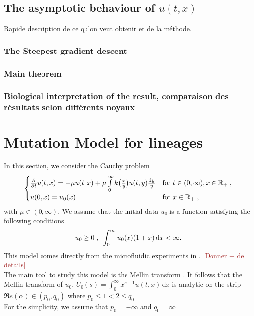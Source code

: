\documentclass[11pt]{amsart}
\renewcommand{\Re}{\mathfrak{R}e}
\newcommand{\diff}{\,\mathrm{d}}
\newcommand{\ndr}[1]{\textcolor{brown}{[#1]}}
\begin{document}
    \subsection*{The asymptotic behaviour of $u(t,x)$}
    Rapide description de ce qu'on veut obtenir et de la méthode.
        \subsubsection*{The Steepest gradient descent}
        \subsubsection*{Main theorem}
        \subsubsection*{Biological interpretation of the result, comparaison des résultats selon différents noyaux}



\section{Mutation Model for lineages}
\label{s:lineage}

In this section, we consider the Cauchy problem
\begin{equation}
    \begin{cases}
	\frac{\partial}{\partial t}u(t,x) = - \mu u(t,x) + \mu \int\limits_{0}^{\infty} k\big( \frac{x}{y}\big)u(t,y) \frac{\mathrm dy}{y}
	& \text{for } t \in (0, \infty), x \in \mathbb{R}_+ \; ,
	\\
	u(0, x) = u_0(x)
	& \text{for } x \in \mathbb{R}_+
	\; ,
    \end{cases}
    \label{eq:main}
\end{equation}
with $\mu \in (0, \infty)$. We assume that the initial data $u_0$ is a function satisfying the following conditions 
$$ u_0 \geq 0 \eqsepv \int_0^\infty u_0(x)(1+x)\diff x < \infty.$$
This model comes directly from the microfluidic experiments in \cite{robert2018mutation}. \ndr{Donner + de détails}\\

The main tool to study this model is the Mellin transform \cite{mellin1897theorie}. It follows that the Mellin transform of $u_0$, $U_0(s)= \int_0^\infty x^{s-1}u(t,x)\diff x$ is analytic on the strip $\Re(\alpha) \in (p_0,q_0)$ where $p_0 \leq 1 < 2 \leq q_0$ \\
For the simplicity, we assume that 
$ p_0=-\infty$ and $q_0 = \infty$\\
\end{document}
